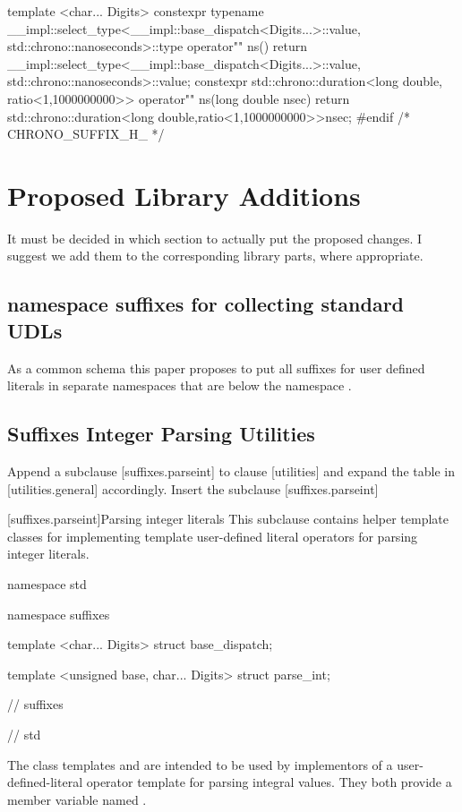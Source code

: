 \documentclass[ebook,11pt,article]{memoir}
\begin{document}
\begin{codeblock}
{{{template <char... Digits>
constexpr typename 
__impl::select_type<__impl::base_dispatch<Digits...>::value,
std::chrono::nanoseconds>::type
operator"" ns(){
    return __impl::select_type<__impl::base_dispatch<Digits...>::value,
               std::chrono::nanoseconds>::value;
}
constexpr std::chrono::duration<long double, ratio<1,1000000000>> 
operator"" ns(long double nsec){
    return std::chrono::duration<long double,ratio<1,1000000000>>{nsec};
}
}}}
#endif /* CHRONO_SUFFIX_H_ */
\end{codeblock}



\chapter{Proposed Library Additions}
It must be decided in which section to actually put the proposed changes. I suggest we add them to the corresponding library parts, where appropriate.
\section{namespace suffixes for collecting standard UDLs}
As a common schema this paper proposes to put all suffixes for user defined literals in separate namespaces that are below the namespace . 

\section{Suffixes Integer Parsing Utilities}
Append a subclause [suffixes.parseint] to clause [utilities] and expand the table in [utilities.general] accordingly.
Insert the subclause [suffixes.parseint]

[suffixes.parseint]{Parsing integer literals}
\pnum
This subclause contains helper template classes for implementing template user-defined literal operators for parsing  integer literals.

\begin{codeblock}
namespace std {
namespace suffixes {

template <char... Digits>
struct base_dispatch;

template <unsigned base, char... Digits>
struct parse_int;

} // suffixes
} // std
\end{codeblock}

\pnum
The class templates  and  are intended to be used by implementors of a user-defined-literal operator template for parsing integral values. They both provide a  member variable named . 
\end{document}
